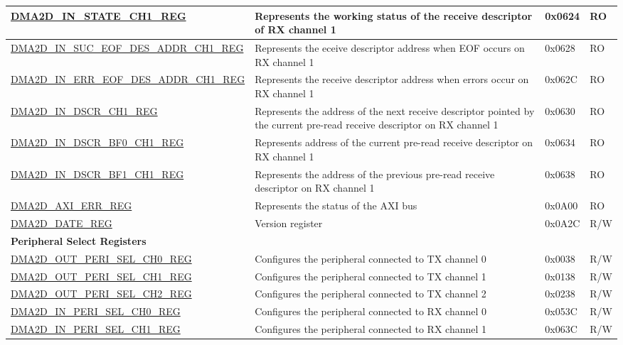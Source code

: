\begin{longtable}{ | p{7cm} | p{11.5cm} | p{1.3cm} | p{2cm} | }
\hyperref[regdesc:DMA2DINSTATECHNREG]{DMA2D\_IN\_STATE\_CH1\_REG} & Represents the working status of the receive descriptor of RX channel 1 & 0x0624 & RO \\ \hline
\hyperref[regdesc:DMA2DINSUCEOFDESADDRCHNREG]{DMA2D\_IN\_SUC\_EOF\_DES\_ADDR\_CH1\_REG} & Represents the eceive descriptor address when EOF occurs on RX channel 1 & 0x0628 & RO \\ \hline
\hyperref[regdesc:DMA2DINERREOFDESADDRCHNREG]{DMA2D\_IN\_ERR\_EOF\_DES\_ADDR\_CH1\_REG} & Represents the receive descriptor address when errors occur on RX channel 1 & 0x062C & RO \\ \hline
\hyperref[regdesc:DMA2DINDSCRCHNREG]{DMA2D\_IN\_DSCR\_CH1\_REG} & Represents the address of the next receive descriptor pointed by the current pre-read receive descriptor on RX channel 1 & 0x0630 & RO \\ \hline
\hyperref[regdesc:DMA2DINDSCRBF0CHNREG]{DMA2D\_IN\_DSCR\_BF0\_CH1\_REG} & Represents address of the current pre-read receive descriptor on RX channel 1 & 0x0634 & RO \\ \hline
\hyperref[regdesc:DMA2DINDSCRBF1CHNREG]{DMA2D\_IN\_DSCR\_BF1\_CH1\_REG} & Represents the address of the previous pre-read receive descriptor on RX channel 1 & 0x0638 & RO \\ \hline
\hyperref[regdesc:DMA2DAXIERRREG]{DMA2D\_AXI\_ERR\_REG} & Represents the status of the AXI bus & 0x0A00 & RO \\ \hline
\hyperref[regdesc:DMA2DDATEREG]{DMA2D\_DATE\_REG} & Version register & 0x0A2C & R/W \\ \hline
\multicolumn{4}{|l|}{\textbf{Peripheral Select Registers}} \\ \hline
\hyperref[regdesc:DMA2DOUTPERISELCHNREG]{DMA2D\_OUT\_PERI\_SEL\_CH0\_REG} & Configures the peripheral connected to TX channel 0 & 0x0038 & R/W \\ \hline
\hyperref[regdesc:DMA2DOUTPERISELCHNREG]{DMA2D\_OUT\_PERI\_SEL\_CH1\_REG} & Configures the peripheral connected to TX channel 1 & 0x0138 & R/W \\ \hline
\hyperref[regdesc:DMA2DOUTPERISELCHNREG]{DMA2D\_OUT\_PERI\_SEL\_CH2\_REG} & Configures the peripheral connected to TX channel 2 & 0x0238 & R/W \\ \hline
\hyperref[regdesc:DMA2DINPERISELCHNREG]{DMA2D\_IN\_PERI\_SEL\_CH0\_REG} & Configures the peripheral connected to RX channel 0 & 0x053C & R/W \\ \hline
\hyperref[regdesc:DMA2DINPERISELCHNREG]{DMA2D\_IN\_PERI\_SEL\_CH1\_REG} & Configures the peripheral connected to RX channel 1 & 0x063C & R/W \\ \hline
\end{longtable}
